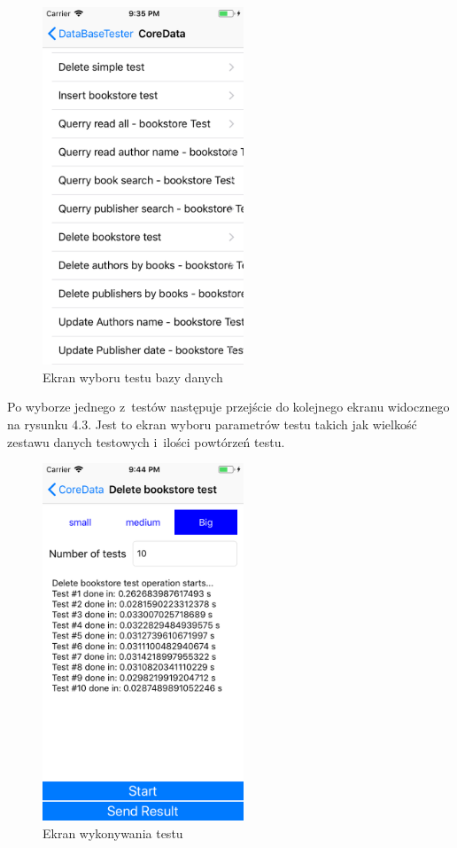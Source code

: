\begin{figure}[h]
\centering
	\includegraphics[width=6cm]{img/application/app-second-view.png}
	\caption{Ekran wyboru testu bazy danych}
	\label{fig: second_app_view}
\end{figure}

\newpage

Po wyborze jednego z~testów następuje przejście do kolejnego ekranu widocznego na rysunku 4.3. Jest to ekran wyboru parametrów testu takich jak wielkość zestawu danych testowych i~ilości powtórzeń testu. 

\begin{figure}[h]
\centering
	\includegraphics[width=6cm]{img/application/app_third-view.png}
	\caption{Ekran wykonywania testu}
	\label{fig: third_app_view}
\end{figure}

